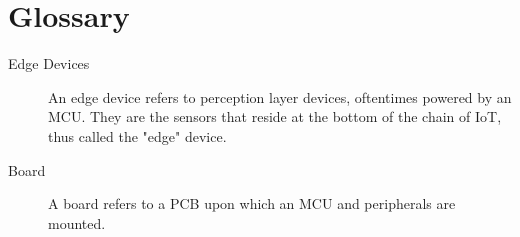 \chapter*{Glossary}


\begin{description}

  \item[Edge Devices] An edge device refers to perception layer devices, oftentimes powered by an MCU. They are the sensors that reside at the bottom of the chain of IoT, thus called the "edge" device.
  \item[Board] A board refers to a PCB upon which an MCU and peripherals are mounted.

\end{description}

